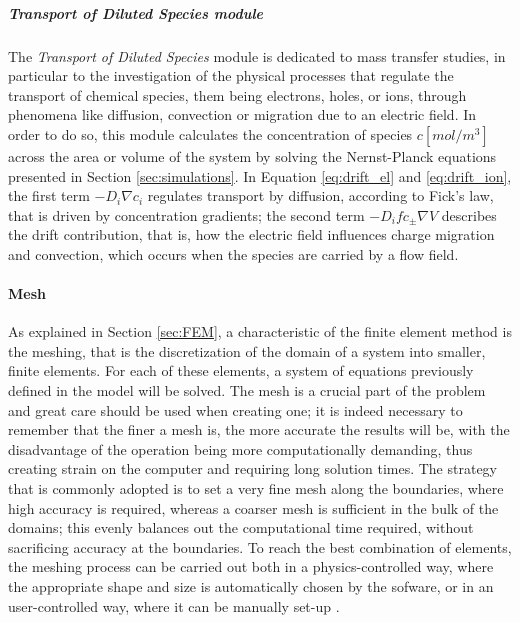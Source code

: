 \subparagraph{Transport of Diluted Species module}
The \emph{Transport of Diluted Species} module is dedicated to mass transfer studies, in particular to the investigation of the physical processes that regulate the transport of chemical species, them being electrons, holes, or ions, through phenomena like diffusion, convection or migration due to an electric field. In order to do so, this module calculates the concentration of species $c \left[mol/m^3\right]$ across the area or volume of the system by solving the Nernst-Planck equations presented in Section \ref{sec:simulations}. In Equation \eqref{eq:drift_el} and \eqref{eq:drift_ion}, the first term $-D_i \nabla c_i$ regulates transport by diffusion, according to Fick's law, that is driven by concentration gradients; the second term $-D_ifc_{\pm}\nabla V$ describes the drift contribution, that is, how the electric field influences charge migration and convection, which occurs when the species are carried by a flow field.

\paragraph{Mesh}
As explained in Section \ref{sec:FEM}, a characteristic of the finite element method is the meshing, that is the discretization of the domain of a system into smaller, finite elements. For each of these elements, a system of equations previously defined in the model will be solved. The mesh is a crucial part of the problem and great care should be used when creating one; it is indeed necessary to remember that the finer a mesh is, the more accurate the results will be, with the disadvantage of the operation being more computationally demanding, thus creating strain on the computer and requiring long solution times. The strategy that is commonly adopted is to set a very fine mesh along the boundaries, where high accuracy is required, whereas a coarser mesh is sufficient in the bulk of the domains; this evenly balances out the computational time required, without sacrificing accuracy at the boundaries. To reach the best combination of elements, the meshing process can be carried out both in a physics-controlled way, where the appropriate shape and size is automatically chosen by the sofware, or in an user-controlled way, where it can be manually set-up \citep{comsolCOMSOL_manual}.

